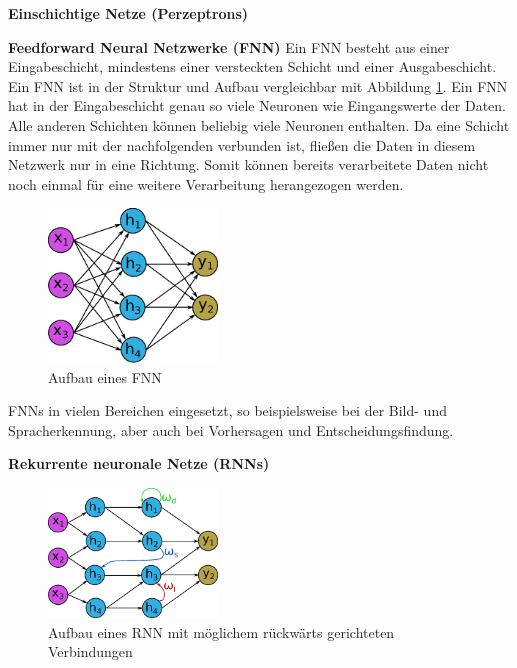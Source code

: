 \textbf{Einschichtige Netze (Perzeptrons)}\vspace{0.2cm}

\textbf{Feedforward Neural Netzwerke (FNN)}\vspace{0.2cm}
Ein FNN besteht aus einer Eingabeschicht, mindestens einer versteckten Schicht und einer Ausgabeschicht. Ein FNN ist in der Struktur und Aufbau vergleichbar mit Abbildung \ref{img:neural_network_fnn}. Ein FNN hat in der Eingabeschicht genau so viele Neuronen wie Eingangswerte der Daten. Alle anderen Schichten können beliebig viele Neuronen enthalten. Da eine Schicht immer nur mit der nachfolgenden verbunden ist, fließen die Daten in diesem Netzwerk nur in eine Richtung. Somit können bereits verarbeitete Daten nicht noch einmal für eine weitere Verarbeitung herangezogen werden.

\begin{figure}[!ht]
	\includegraphics[width=0.4\textwidth]{content/chapter_basics/images/neuronal_network_fnn.eps}
	\centering
	\caption{Aufbau eines FNN}
	\label{img:neural_network_fnn}
\end{figure}

FNNs in vielen Bereichen eingesetzt, so beispielsweise bei der Bild- und Spracherkennung, aber auch bei Vorhersagen und Entscheidungsfindung.\vspace{0.2cm}

\textbf{Rekurrente neuronale Netze (RNNs)}\vspace{0.2cm}

\begin{figure}[!ht]
	\includegraphics[width=0.4\textwidth]{content/chapter_basics/images/neuronal_network_rnn.eps}
	\centering
	\caption{Aufbau eines RNN mit möglichem rückwärts gerichteten Verbindungen}
	\label{img:neural_network_rnn}
\end{figure}

